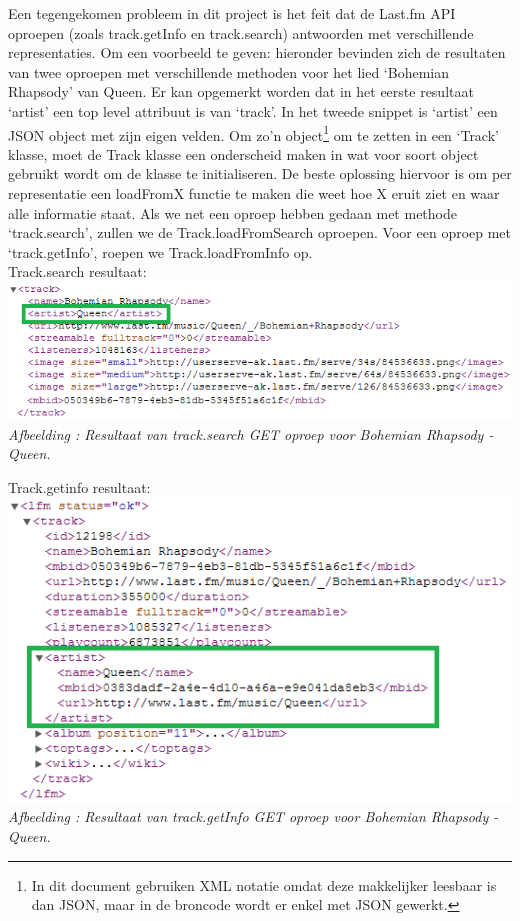 \documentclass[11pt,a4paper]{article}
\newcounter{figc}
\newcommand{\increaseFigID} {%
   \stepcounter{figc}%
   \thefigc}
\newcommand{\figID}[1]{\small \textit{Afbeelding \increaseFigID : #1} \\ \normalsize}
\begin{document}
	Een tegengekomen probleem in dit project is het feit dat de Last.fm API oproepen (zoals track.getInfo en track.search) antwoorden met verschillende representaties. Om een voorbeeld te geven: hieronder bevinden zich de resultaten van twee oproepen met verschillende methoden voor het lied `Bohemian Rhapsody' van Queen. Er kan opgemerkt worden dat in het eerste resultaat `artist' een top level attribuut is van `track'. In het tweede snippet is `artist' een JSON object met zijn eigen velden. Om zo'n object\footnote{In dit document gebruiken XML notatie omdat deze makkelijker leesbaar is dan JSON, maar in de broncode wordt er enkel met JSON gewerkt.} om te zetten in een `Track' klasse, moet de Track klasse een onderscheid maken in wat voor soort object gebruikt wordt om de klasse te initialiseren. De beste oplossing hiervoor is om per representatie een loadFromX functie te maken die weet hoe X eruit ziet en waar alle informatie staat. Als we net een oproep hebben gedaan met methode `track.search', zullen we de Track.loadFromSearch oproepen. Voor een oproep met `track.getInfo', roepen we Track.loadFromInfo op. \\
	
	Track.search resultaat:\\
	\includegraphics[scale=0.8]{Pictures/track_search2.png} \\ \newline
	\figID{Resultaat van track.search GET oproep voor Bohemian Rhapsody - Queen.}

	Track.getinfo resultaat: \\
	\includegraphics[scale=0.8]{Pictures/track_getinfo2.png}\\ \newline
	\figID{Resultaat van track.getInfo GET oproep voor Bohemian Rhapsody - Queen.}
	
\end{document}
